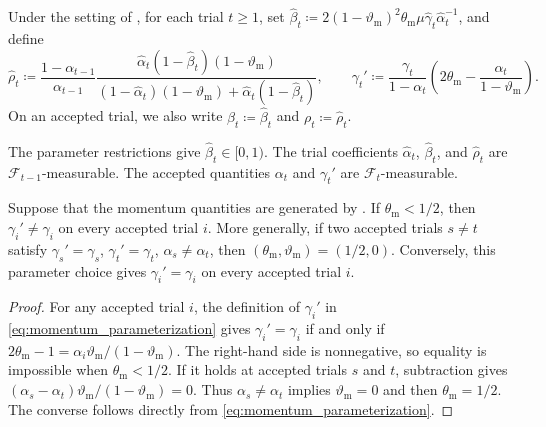 \documentclass{article}
\begin{document}
\begin{definition}
\label{Momentum_para}
Under the setting of , for each trial \(t\ge1\), set
$\hat\beta_t
\coloneqq 
2(1-\vartheta_{\mathrm{m}})^2\theta_{\mathrm{m}}\mu
\hat\gamma_t\hat\alpha_t^{-1}$, and define
\begin{equation}\label{eq:momentum_parameterization}
\hat\rho_t
\coloneqq \frac{1-\alpha_{t-1}}{\alpha_{t-1}}
\frac{
\hat\alpha_t(1-\hat\beta_t)(1-\vartheta_{\mathrm{m}})
}{
(1-\hat\alpha_t)(1-\vartheta_{\mathrm{m}})
+\hat\alpha_t(1-\hat\beta_t)
},\qquad
\gamma_t'
\coloneqq 
\frac{\gamma_t}{1-\alpha_t}
\left(
2\theta_{\mathrm{m}}
-\frac{\alpha_t}{1-\vartheta_{\mathrm{m}}}
\right).
\end{equation}
On an accepted trial, we also write
\(\beta_t\coloneqq \hat\beta_t\) and \(\rho_t\coloneqq \hat\rho_t\).
\end{definition}

The parameter restrictions give \(\hat\beta_t\in[0,1)\).
The trial coefficients \(\hat\alpha_t\), \(\hat\beta_t\),
and \(\hat\rho_t\) are \(\mathcal F_{t-1}\)-measurable.
The accepted quantities \(\alpha_t\) and \(\gamma_t'\)
are \(\mathcal F_t\)-measurable.

\begin{proposition}
\label{prop:gamma_prime_equal_gamma}
Suppose that the momentum quantities are generated by
. If \(\theta_{\mathrm{m}}<1/2\), then
\(\gamma_i'\ne\gamma_i\) on every accepted trial \(i\).
More generally, if two accepted trials \(s\ne t\) satisfy
$\gamma_s'=\gamma_s$,
$\gamma_t'=\gamma_t$,
$\alpha_s\ne\alpha_t$,
then
$(\theta_{\mathrm{m}},\vartheta_{\mathrm{m}})=(1/2,0)$.
Conversely, this parameter choice gives
\(\gamma_i'=\gamma_i\) on every accepted trial \(i\).
\end{proposition}
\begin{proof}
For any accepted trial \(i\), the definition of \(\gamma_i'\) in
\eqref{eq:momentum_parameterization} gives
\(\gamma_i'=\gamma_i\) if and only if
\(2\theta_{\mathrm{m}}-1
=\alpha_i\vartheta_{\mathrm{m}}/(1-\vartheta_{\mathrm{m}})\).
The right-hand side is nonnegative, so equality is impossible when
\(\theta_{\mathrm{m}}<1/2\). If it holds at accepted trials \(s\) and \(t\),
subtraction gives
\((\alpha_s-\alpha_t)\vartheta_{\mathrm{m}}/(1-\vartheta_{\mathrm{m}})=0\).
Thus \(\alpha_s\ne\alpha_t\) implies
\(\vartheta_{\mathrm{m}}=0\) and then \(\theta_{\mathrm{m}}=1/2\).
The converse follows directly from
\eqref{eq:momentum_parameterization}.
\end{proof}
\end{document}
